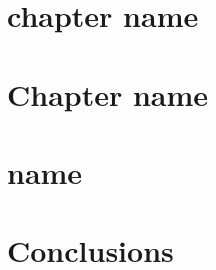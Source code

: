 \documentclass[letterpaper, 12pt, oneside]{book}
\begin{document}
\frontmatter


\setcounter{page}{2}






\begingroup
\renewcommand{\addcontentsline}[3]{} %
\tableofcontents
\endgroup

\clearpage
\newpage
\listoftables
\newpage
\listoffigures

\mainmatter

\chapter{chapter name} \label{intro}
\chaptermark{} %

%
%

\chapter{Chapter name}\label{label}



\chapter{name}\label{label}



%
%




\newpage
\clearpage

\chapter{Conclusions}




\clearpage
\newpage


\appendix
\begin{appendices}


\end{appendices}
\clearpage

%
%


%
%

\singlespacing


\end{document}
